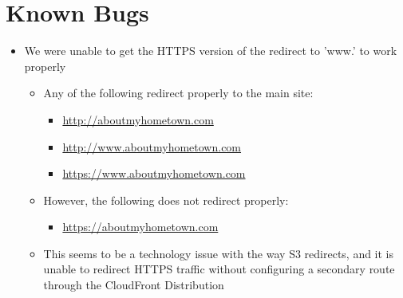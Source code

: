 \documentclass[12pt]{article}
\begin{document}
\newpage

\section{Known Bugs}

\begin{itemize}
    \item We were unable to get the HTTPS version of the redirect to 'www.' to work properly
          \begin{itemize}
              \item Any of the following redirect properly to the main site:
                    \begin{itemize}
                        \item \href{http://aboutmyhometown.com}{\url{http://aboutmyhometown.com}}
                        \item \href{http://www.aboutmyhometown.com}{\url{http://www.aboutmyhometown.com}}
                        \item \href{https://www.aboutmyhometown.com}{\url{https://www.aboutmyhometown.com}}
                    \end{itemize}
              \item However, the following does not redirect properly:
                    \begin{itemize}
                        \item \href{https://aboutmyhometown.com}{\url{https://aboutmyhometown.com}}
                    \end{itemize}
              \item This seems to be a technology issue with the way S3 redirects, and it is unable to redirect HTTPS traffic without configuring a secondary route through the CloudFront Distribution
          \end{itemize}
\end{itemize}
\end{document}
